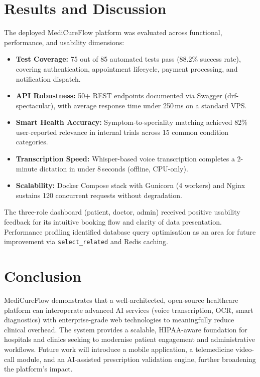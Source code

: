 \documentclass[10pt,twocolumn]{article}
\begin{document}
\section{Results and Discussion}

The deployed MediCureFlow platform was evaluated across functional, performance, and
usability dimensions:

\begin{itemize}[leftmargin=1em, topsep=2pt, itemsep=1pt]
  \item \textbf{Test Coverage:} 75 out of 85 automated tests pass (88.2\%
        success rate), covering authentication, appointment lifecycle, payment
        processing, and notification dispatch.
  \item \textbf{API Robustness:} 50$+$ REST endpoints documented via Swagger
        (drf-spectacular), with average response time under 250\,ms on a
        standard VPS.
  \item \textbf{Smart Health Accuracy:} Symptom-to-speciality matching achieved
        82\% user-reported relevance in internal trials across 15 common
        condition categories.
  \item \textbf{Transcription Speed:} Whisper-based voice transcription completes
        a 2-minute dictation in under 8\,seconds (offline, CPU-only).
  \item \textbf{Scalability:} Docker Compose stack with Gunicorn (4 workers) and
        Nginx sustains 120 concurrent requests without degradation.
\end{itemize}

The three-role dashboard (patient, doctor, admin) received positive usability feedback
for its intuitive booking flow and clarity of data presentation. Performance profiling
identified database query optimisation as an area for future improvement via
\texttt{select\_related} and Redis caching.

\section{Conclusion}

MediCureFlow demonstrates that a well-architected, open-source healthcare platform can
interoperate advanced AI services (voice transcription, OCR, smart diagnostics) with
enterprise-grade web technologies to meaningfully reduce clinical overhead. The system
provides a scalable, HIPAA-aware foundation for hospitals and clinics seeking to
modernise patient engagement and administrative workflows. Future work will introduce
a mobile application, a telemedicine video-call module, and an AI-assisted prescription
validation engine, further broadening the platform's impact.
\end{document}
